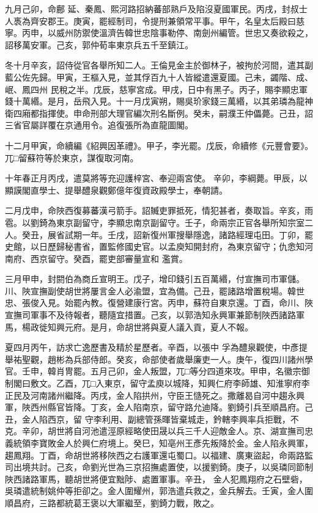 \begin{pinyinscope}
 九月己卯，命鄜
 延、秦鳳、熙河路招納蕃部熟戶及陷沒夏國軍民。丙戌，封叔士人褭為齊安郡王。庚寅，罷經制司，令提刑兼領常平事。甲午，名皇太后殿曰慈寧。丙申，以威州防禦使溫濟告韓世忠陰事勒停、南劍州編管。世忠又奏欲殺之，詔移萬安軍。己亥，郭仲荀率東京兵五千至鎮江。



 冬十月辛亥，詔侍從官各舉所知二人。王倫見金主於御林子，被拘於河間，遣其副藍公佐先歸。甲寅，王樞入見，並其俘百九十人皆縱遣還夏國。己未，蠲階、成、岷、鳳四州
 民稅之半。戊辰，慈寧宮成。甲戌，日中有黑子。丙子，賜李顯忠軍錢十萬緡。是月，岳飛入見。十一月戊寅朔，賜吳玠家錢三萬緡，以其弟璘為龍神衛四廂都指揮使。申命刑部大理官編次刑名斷例。癸未，嗣濮王仲儡薨。己丑，詔三省官屬詳覆在京通用令。追復張所為直龍圖閣。



 十二月甲寅，命續編《紹興因革禮》。甲子，李光罷。戊辰，命續修《元豐會要》。兀□留蘇符等於東京，謀復取河南。



 十年春正月丙戌，遣莫將等充迎護梓宮、奉迎兩宮使。
 辛卯，李綱薨。甲辰，以顯謨閣直學士、提舉醴泉觀鄭億年復資政殿學士，奉朝請。



 二月戊申，命陜西復募蕃漢弓箭手。詔贓吏罪抵死，情犯甚者，奏取旨。辛亥，雨雹。以劉錡為東京副留守，李顯忠南京副留守。壬子，命兩宗正官各舉所知宗室二人。癸丑，展省試期一年。壬戌，詔新復州軍搜舉隱逸，諸路經理屯田。丁卯，罷史館，以日歷歸秘書省，置監修國史官。以孟庾知開封府，為東京留守；仇悆知河南府、西京留守。癸酉，罷吏部審量宣和
 濫賞。



 三月甲申，封閼伯為商丘宣明王。戊子，增印錢引五百萬緡，付宣撫司市軍儲。川、陜宣撫副使胡世將屢言金人必渝盟，宜為備。己丑，罷諸路增置稅場。韓世忠、張俊入見。始罷內教。復營建康行宮。丙申，蘇符自東京還。丁酉，命川、陜宣撫司軍事不及待報者，聽隨宜措置。己亥，以郭浩知永興軍兼節制陜西諸路軍馬，楊政徙知興元府。是月，命胡世將與夏人議入貢，夏人不報。



 夏四月丙午，訪求亡逸歷書及精於星歷者。辛酉，以張中
 孚為醴泉觀使，中彥提舉祐聖觀，趙彬為兵部侍郎。癸亥，命部使者歲舉廉吏一人。庚午，復四川諸州學官。壬申，韓肖冑罷。五月己卯，金人叛盟，兀□等分四道來攻。甲申，名徽宗御制閣曰敷文。乙酉，兀□入東京，留守孟庾以城降，知興仁府李師雄、知淮寧府李正民及河南諸州繼降。丙戌，金人陷拱州，守臣王慥死之。撒離曷自河中趨永興軍，陜西州縣官皆降。丁亥，金人陷南京，留守路允迪降。劉錡引兵至順昌府。己丑，金人陷西京，留
 守李利用、副總管孫暉皆棄城走，鈐轄李興率兵拒戰，不克。辛卯，胡世將自河池遣涇原經略使田晟以兵三千人迎敵金人。京、湖宣撫司忠義統領李寶敗金人於興仁府境上。癸巳，知亳州王彥先叛降於金。金人陷永興軍，趨鳳翔。丁酉，命胡世將移陜西之右護軍還屯蜀口。以福建、廣東盜起，命兩路監司出境共討。己亥，命劉光世為三京招撫處置使，以援劉錡。庚子，以吳璘同節制陜西諸路軍馬，聽胡世將便宜黜陟、處置軍事。辛丑，
 金人犯鳳翔府之石壁砦，吳璘遣統制姚仲等拒卻之。金人圍耀州，郭浩遣兵救之，金兵解去。壬寅，金人圍順昌府，三路都統葛王褒以大軍繼至，劉錡力戰，敗之。




\end{pinyinscope}
